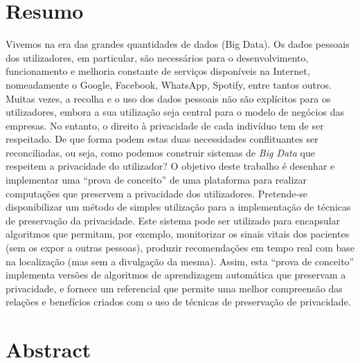 %

\chapter*{Resumo} %
\thispagestyle{empty}

Vivemos na era das grandes quantidades de dados (Big Data). Os dados pessoais dos utilizadores, em particular, s\~{a}o necess\'{a}rios para o desenvolvimento, funcionamento e melhoria constante de servi\c{c}os dispon\'{i}veis na Internet, nomeadamente o Google, Facebook, WhatsApp, Spotify, entre tantos outros. Muitas vezes, a recolha e o uso dos dados pessoais n\~{a}o s\~{a}o expl\'{i}citos para os utilizadores, embora a sua utiliza\c{c}\~{a}o seja central para o modelo de neg\'{o}cios das empresas. No entanto, o direito \`{a} privacidade de cada indiv\'{i}duo tem de ser respeitado.
De que forma podem estas duas necessidades conflituantes ser reconciliadas, ou seja, como podemos construir sistemas de \textit{Big Data} que respeitem a privacidade do utilizador? O objetivo deste trabalho \'{e} desenhar e implementar uma ``prova de conceito'' de uma plataforma para realizar computa\c{c}\~{o}es que preservem a privacidade dos utilizadores. Pretende-se disponibilizar um m\'{e}todo de simples utiliza\c{c}\~{a}o para a implementa\c{c}\~{a}o de t\'{e}cnicas de preserva\c{c}\~{a}o da privacidade. Este sistema pode ser utilizado para encapsular algoritmos que permitam, por exemplo, monitorizar os sinais vitais dos pacientes (sem os expor a outras pessoas), produzir recomenda\c{c}\~{o}es em tempo real com base na localiza\c{c}\~{a}o (mas sem a divulga\c{c}\~{a}o da mesma). Assim, esta ``prova de conceito'' implementa vers\~{o}es de algoritmos de aprendizagem autom\'{a}tica que preservam a privacidade, e fornece um referencial que permite uma melhor compreens\~{a}o das rela\c{c}\~{o}es e benef\'{i}cios criados com o uso de t\'{e}cnicas de preserva\c{c}\~{a}o de privacidade.


\newpage

\chapter*{Abstract} %
\thispagestyle{empty}

